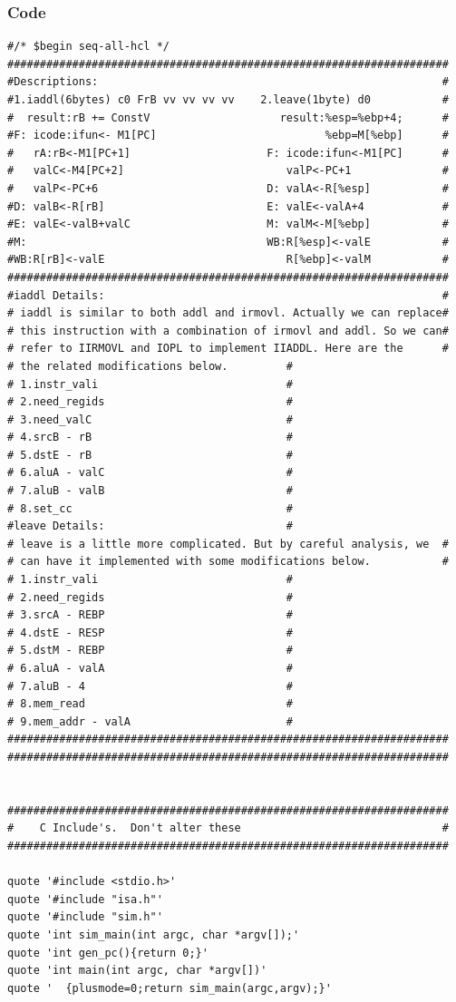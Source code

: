 \documentclass{article}
\begin{document}
\subsubsection{Code}
  \begin{lstlisting}[caption={}]
#/* $begin seq-all-hcl */
####################################################################
#Descriptions:                                                     #
#1.iaddl(6bytes) c0 FrB vv vv vv vv    2.leave(1byte) d0           #
#  result:rB += ConstV                    result:%esp=%ebp+4;      #
#F: icode:ifun<- M1[PC]                          %ebp=M[%ebp]      #
#   rA:rB<-M1[PC+1]                     F: icode:ifun<-M1[PC]      #
#   valC<-M4[PC+2]                         valP<-PC+1              #
#   valP<-PC+6                          D: valA<-R[%esp]           #
#D: valB<-R[rB]                         E: valE<-valA+4            #
#E: valE<-valB+valC                     M: valM<-M[%ebp]           #
#M:                                     WB:R[%esp]<-valE           #
#WB:R[rB]<-valE                            R[%ebp]<-valM           #
####################################################################
#iaddl Details:							   						   #
# iaddl is similar to both addl and irmovl. Actually we can replace#
# this instruction with a combination of irmovl and addl. So we can#
# refer to IIRMOVL and IOPL to implement IIADDL. Here are the 	   #
# the related modifications below.		   #
# 1.instr_vali							   #
# 2.need_regids							   #
# 3.need_valC							   # 
# 4.srcB - rB							   # 
# 5.dstE - rB							   # 
# 6.aluA - valC							   # 
# 7.aluB - valB							   # 
# 8.set_cc							   	   # 
#leave Details:							   # 
# leave is a little more complicated. But by careful analysis, we  #
# can have it implemented with some modifications below.  	   	   #
# 1.instr_vali							   # 
# 2.need_regids							   # 
# 3.srcA - REBP							   # 
# 4.dstE - RESP							   # 
# 5.dstM - REBP							   # 
# 6.aluA - valA							   # 
# 7.aluB - 4							   # 
# 8.mem_read							   # 
# 9.mem_addr - valA						   # 
####################################################################
####################################################################


####################################################################
#    C Include's.  Don't alter these                               #
####################################################################

quote '#include <stdio.h>'
quote '#include "isa.h"'
quote '#include "sim.h"'
quote 'int sim_main(int argc, char *argv[]);'
quote 'int gen_pc(){return 0;}'
quote 'int main(int argc, char *argv[])'
quote '  {plusmode=0;return sim_main(argc,argv);}'


\end{lstlisting}
\end{document}
